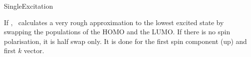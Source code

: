   \begin{fdflogicalF}{SingleExcitation}
  
    If \fdftrue, \siesta\ calculates a very rough approximation to the
    lowest excited state by swapping the populations of the HOMO and the
    LUMO. If there is no spin polarisation, it is half swap only.  It is
    done for the first spin component (up) and first $k$ vector.
  
  \end{fdflogicalF}
  